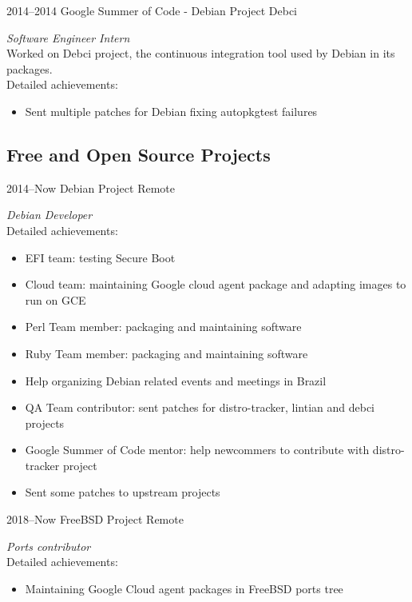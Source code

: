 \documentclass[print]{friggeri-cv}
\begin{document}
\begin{entrylist}

\entry
{2014--2014}
{Google Summer of Code - Debian Project}
{Debci}
{\emph{Software Engineer Intern} \\
  Worked on Debci project, the continuous integration tool used by Debian in
  its packages. \\
Detailed achievements:
\begin{itemize}
  \item Sent multiple patches for Debian fixing autopkgtest failures
\end{itemize}
}


\end{entrylist}

\subsection{Free and Open Source Projects}

\begin{entrylist}

\entry
{2014--Now}
{Debian Project}
{Remote}
{\emph{Debian Developer} \\
Detailed achievements:
  \begin{itemize}
    \item EFI team: testing Secure Boot
    \item Cloud team: maintaining Google cloud agent package and adapting
    images to run on GCE
    \item Perl Team member: packaging and maintaining software
    \item Ruby Team member: packaging and maintaining software
    \item Help organizing Debian related events and meetings in Brazil
    \item QA Team contributor: sent patches for distro-tracker, lintian and
    debci projects 
    \item Google Summer of Code mentor: help newcommers to contribute with
    distro-tracker project
    \item Sent some patches to upstream projects
  \end{itemize}}

\entry
{2018--Now}
{FreeBSD Project}
{Remote}
{\emph{Ports contributor} \\
Detailed achievements:
  \begin{itemize}
    \item Maintaining Google Cloud agent packages in FreeBSD ports tree
  \end{itemize}}


\end{entrylist}
\end{document}
